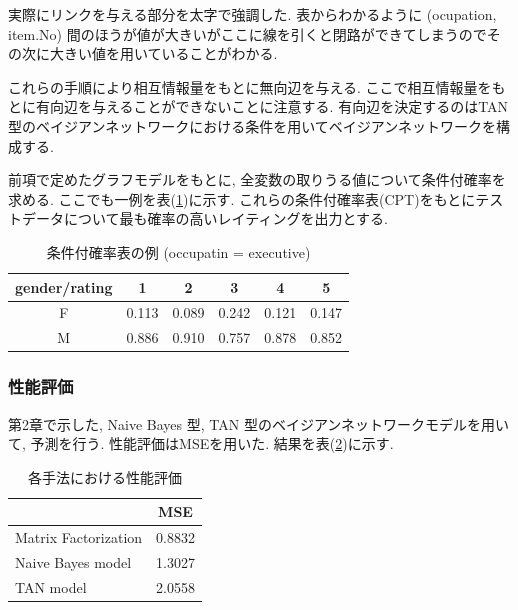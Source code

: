 \documentclass[a4j,12pt]{jarticle}
\begin{document}
実際にリンクを与える部分を太字で強調した. 表からわかるように (ocupation, item.No) 間のほうが値が大きいがここに線を引くと閉路ができてしまうのでその次に大きい値を用いていることがわかる.

これらの手順により相互情報量をもとに無向辺を与える. ここで相互情報量をもとに有向辺を与えることができないことに注意する. 有向辺を決定するのはTAN 型のベイジアンネットワークにおける条件を用いてベイジアンネットワークを構成する.

前項で定めたグラフモデルをもとに, 全変数の取りうる値について条件付確率を求める. ここでも一例を表(\ref{CPTsample})に示す. これらの条件付確率表(CPT)をもとにテストデータについて最も確率の高いレイティングを出力とする.

\begin{table}[H]
\begin{center}
\label{CPTsample}
\caption{条件付確率表の例 (occupatin = executive)}
\begin{tabular}{|c||c|c|c|c|c|} \hline  
gender/rating & 1 & 2 & 3 & 4 & 5 \\ \hline \hline
F & 0.113 & 0.089 & 0.242 & 0.121 & 0.147 \\
M & 0.886 & 0.910 & 0.757 & 0.878 & 0.852 \\ \hline
\end{tabular}
\end{center}
\end{table}

\subsubsection{性能評価}

第2章で示した, Naive Bayes 型, TAN 型のベイジアンネットワークモデルを用いて, 予測を行う. 性能評価はMSEを用いた. 結果を表(\ref{modelmse})に示す.

\begin{table}[H]
\begin{center}
\caption{各手法における性能評価}   %
\label{modelmse}   %
\begin{tabular}{l c}
\hline
                            & MSE \\ \hline
Matrix Factorization &  0.8832 \\ \hline
Naive Bayes model  & 1.3027 \\ \hline
TAN model             & 2.0558 \\ \hline
\end{tabular}
\end{center}
\end{table}
\end{document}
